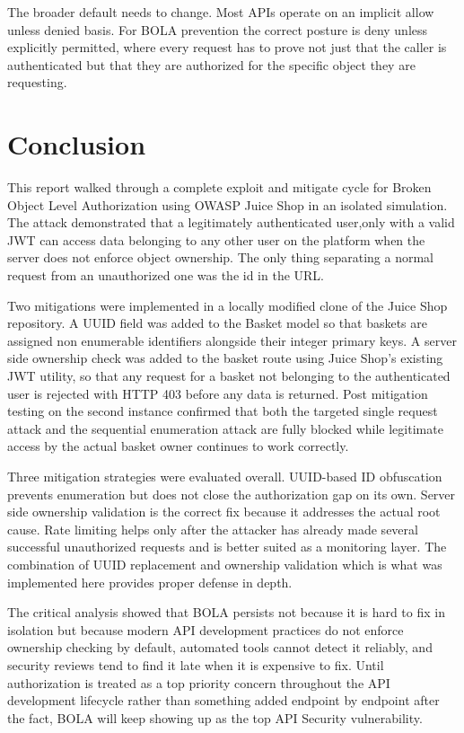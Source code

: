 \documentclass[12pt]{IEEEtran}
\begin{document}
The broader default needs to change. Most APIs operate on an implicit allow unless denied basis. For BOLA prevention the correct posture is deny unless explicitly permitted, where every request has to prove not just that the caller is authenticated but that they are authorized for the specific object they are requesting.

\section{Conclusion}

This report walked through a complete exploit and mitigate cycle for Broken Object Level Authorization using OWASP Juice Shop in an isolated simulation. The attack demonstrated that a legitimately authenticated user,only with a valid JWT can access data belonging to any other user on the platform when the server does not enforce object ownership. The only thing separating a normal request from an unauthorized one was the id in the URL.

Two mitigations were implemented in a locally modified clone of the Juice Shop repository. A UUID field was added to the Basket model so that baskets are assigned non enumerable identifiers alongside their integer primary keys. A server side ownership check was added to the basket route using Juice Shop's existing JWT utility, so that any request for a basket not belonging to the authenticated user is rejected with HTTP 403 before any data is returned. Post mitigation testing on the second instance confirmed that both the targeted single request attack and the sequential enumeration attack are fully blocked while legitimate access by the actual basket owner continues to work correctly.

Three mitigation strategies were evaluated overall. UUID-based ID obfuscation prevents enumeration but does not close the authorization gap on its own. Server side ownership validation is the correct fix because it addresses the actual root cause. Rate limiting helps only after the attacker has already made several successful unauthorized requests and is better suited as a monitoring layer. The combination of UUID replacement and ownership validation which is what was implemented here provides proper defense in depth.

The critical analysis showed that BOLA persists not because it is hard to fix in isolation but because modern API development practices do not enforce ownership checking by default, automated tools cannot detect it reliably, and security reviews tend to find it late when it is expensive to fix. Until authorization is treated as a top priority concern throughout the API development lifecycle rather than something added endpoint by endpoint after the fact, BOLA will keep showing up as the top API Security vulnerability.
\end{document}
